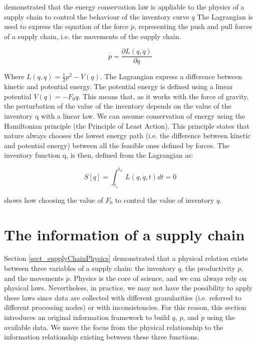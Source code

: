 \cite{Spearman2014} demonstrated that the energy conservation law is appliable to the physics of a supply chain to control the behaviour of the inventory curve $q$ The Lagrangian is used to express the equation of the force $\dot{p}$, representing the push and pull forces of a supply chain, i.e. the movements of the supply chain.

\begin{equation}
\dot{p}=\frac{\partial L(q,\dot{q})}{\partial q}
\label{eq_physics3}
\end{equation}

Where $L\left(q,\dot{q}\right)=\frac{1}{2}p^2-V(q)$. The Lagrangian express a difference between kinetic and potential energy. The potential energy is defined using a linear potential $V\left(q\right)=-F_0q$. This means that, as it works with the force of gravity, the perturbation of the value of the inventory depends on the value of the inventory q with a linear law. We can assume conservation of energy using the Hamiltonian principle (the Principle of Least Action). This principle states that nature always chooses the lowest energy path (i.e. the difference between kinetic and potential energy) between all the feasible ones defined by forces. The inventory function q, is then, defined from the Lagrangian as:

\begin{equation}
S\left[q\right]=\int_{t_1}^{t_2}{\ L(q,\dot{q},t)dt}=0
\label{eq_physics4}
\end{equation}

\cite{Spearman2014} shows how choosing the value of $F_0$ to control the value of inventory $q$.


\section{The information of a supply chain}
Section \ref{sect_supplyChainPhysics} demonstrated that a physical relation exists between three variables of a supply chain: the inventory $q$, the productivity $p$, and the movements $\dot{p}$. Physics is the core of science, and we can always rely on physical laws. Nevertheless, in practice, we may not have the possibility to apply these laws since data are collected with different granularities (i.e. referred to different processing nodes) or with inconsistencies. For this reason, this section introduces an original information framework to build $q$, $p$, and $\dot{p}$ using the available data. We move the focus from the physical relationship to the information relationship existing between these three functions.

